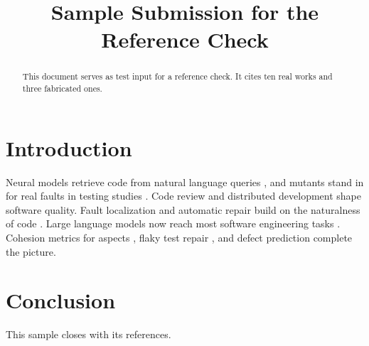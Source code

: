 \documentclass[10pt,conference]{IEEEtran}
\begin{document}
\title{Sample Submission for the Reference Check}
\author{}
\maketitle

\begin{abstract}
This document serves as test input for a reference check. It cites ten real works and three fabricated ones.
\end{abstract}

\section{Introduction}
Neural models retrieve code from natural language queries \cite{gu2018}, and mutants stand in for real faults
in testing studies \cite{just2014mutants, just2014defects4j}. Code review \cite{bacchelli2013} and distributed
development \cite{bird2009} shape software quality. Fault localization \cite{wong2016} and automatic repair
\cite{legoues2012, brennan2009} build on the naturalness of code \cite{hindle2012}. Large language models now
reach most software engineering tasks \cite{hou2024}. Cohesion metrics for aspects \cite{kumar2008}, flaky test
repair \cite{hartmann2023}, and defect prediction \cite{zhao2024} complete the picture.

\section{Conclusion}
This sample closes with its references.
\end{document}
